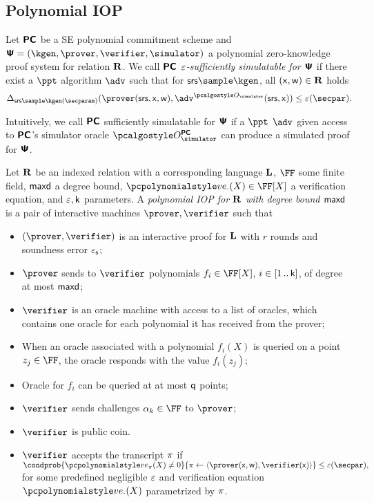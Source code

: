 \documentclass[runningheads,11pt]{llncs}
\begin{document}
\subsection{Polynomial IOP}
 \begin{definition}
   Let $\bm{\mathsf{PC}}$ be a SE polynomial commitment scheme and
   $\PS = (\kgen, \prover, \verifier, \simulator)$ a polynomial zero-knowledge proof system
   for relation $\mathbf{R}$. We call $\bm{\mathsf{PC}}$ \emph{$\varepsilon$-sufficiently simulatable for
     $\bm{\mathsf{\Psi}}$} if there exist a $\ppt$ algorithm $\adv$ such that for
   $\srs \sample \kgen$, all $(\mathsf{x}, \mathsf{w}) \in \mathbf{R}$ holds
   \[
     \SD_{\srs \sample \kgen(\secparam)}(\prover(\srs, \inp, \wit),
     \adv^{\oracles}(\srs, \inp)) \leq \eps(\secpar).
   \]
 \end{definition}
 Intuitively, we call $\bm{\mathsf{PC}}$ sufficiently simulatable for $\bm{\mathsf{\Psi}}$ if a $\ppt$
 $\adv$ given access to $\bm{\mathsf{PC}}$'s simulator oracle $\oraclespcom$ can produce a
 simulated proof for $\bm{\mathsf{\Psi}}$.

 \begin{definition}
  \label{def:piop}
  Let $\mathbf{R}$ be an indexed relation with a corresponding language $\mathbf{L}$, $\FF$
  some finite field, $\mathsf{maxd}$ a degree bound, $\vereq_{\cdot}(X) \in \FF[X]$ a
  verification equation, and $\varepsilon, \mathsf{k}$ parameters.
  A \emph{polynomial
    IOP for $\mathbf{R}$ with degree bound $\mathsf{maxd}$} is a pair of interactive
  machines $\prover, \verifier$ such that
\begin{itemize}
\item $(\prover, \verifier)$ is an interactive proof for $\mathbf{L}$ with $r$ rounds
  and soundness error $\varepsilon_{\mathsf{s}}$;
\item $\prover$ sends to $\verifier$ polynomials $f_i \in \FF[X]$,
  $i \in [1 \, .. \, \mathsf{k}]$, of degree at most $\mathsf{maxd}$;
\item $\verifier$ is an oracle machine with access to a list of oracles, which
  contains one oracle for each polynomial it has received from the prover;
\item When an oracle associated with a polynomial $f_i(X)$ is queried on a point
  $z_j \in \FF$, the oracle responds with the value $f_i(z_j)$; 
\item Oracle for $f_i$ can be queried at at most $\mathsf{q}$ points; 
\item $\verifier$ sends challenges $\alpha_k \in \FF$ to $\prover$;
\item $\verifier$ is public coin.
\item $\verifier$ accepts the transcript $\pi$ if
  \(
    \condprob{\vereq_{\zkproof}(X) \neq 0}{\zkproof \gets \langle\prover(\inp,
        \wit), \verifier(\inp)\rangle} \leq \eps(\secpar),
  \)
  for some predefined negligible $\varepsilon$ and verification equation $\vereq_{\cdot}(X)$
  parametrized by $\pi$.
\end{itemize}
\end{definition}
\end{document}
